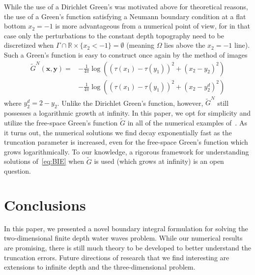 \documentclass[review,hidelinks,onefignum,onetabnum]{siamart220329}
\newcommand{\R}{\mathbb{R}}
\newcommand{\bx}{\mathbf{x}}
\newcommand{\by}{\mathbf{y}}
\begin{document}
\begin{remark}
While the use of a Dirichlet Green's was motivated above for theoretical reasons, the use of a Green's function satisfying a Neumann boundary condition at a flat bottom $x_2 = -1$ is more advantageous from a numerical point of view, for in that case only the perturbations to the constant depth topography need to be discretized when $\Gamma \cap \R \times \{ x_2<-1 \}  = \emptyset$ (meaning $\Omega$ lies above the $x_2=-1$ line). Such a Green's function is easy to construct once again by the method of images
\begin{align}
    \label{neumann-green-function}
    \widetilde{G}^N(\bx,\by) = &-\frac{1}{4\pi}\log \left((\tau(x_1) - \tau(y_1))^2 + (x_2 - y_2)^2\right) \\
    &- \frac{1}{4\pi}\log \left((\tau(x_1) - \tau(y_1))^2 + (x_2 - y_2^d)^2 \right) \nonumber
\end{align}
where $y_2^d = 2 - y_2$. Unlike the Dirichlet Green's function, however, $\widetilde{G}^N$ still possesses a logarithmic growth at infinity. In this paper, we opt for simplicity and utilize the free-space Green's function $\widetilde{G}$ in all of the numerical examples of~. As it turns out, the numerical solutions we find decay exponentially fast as the truncation parameter is increased, even for the free-space Green's function which grows logarithmically. To our knowledge, a rigorous framework for understanding solutions of~\cref{eq:BIE} when $\widetilde{G}$ is used (which grows at infinity) is an open question. 
\end{remark}

\section{Conclusions}\label{sec:conclusions} In this paper, we presented a novel boundary integral formulation for solving the two-dimensional finite depth water waves problem. While our numerical results are promising, there is still much theory to be developed to better understand the truncation errors. Future directions of research that we find interesting are extensions to infinite depth and the three-dimensional problem. 

\appendix
\end{document}
